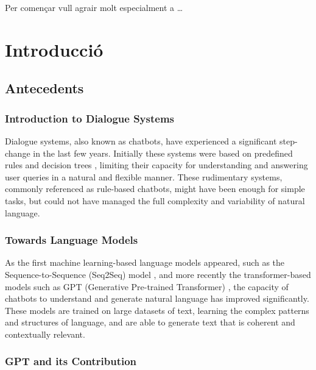 \documentclass[a4paper,12pt,twoside]{ThesisStyle}
\begin{document}
Per començar vull agrair molt especialment a \ldots


\tableofcontents

\listoffigures

\listoftables

\mainmatter

\chapter{Introducció}
\label{cap:intro}

\section{Antecedents}
\label{sec:antecedents}

\subsection{Introduction to Dialogue Systems}
\label{subsec:chat}

Dialogue systems, also known as chatbots, have experienced a significant step-change in the last few years. Initially these systems were based on predefined rules and decision trees \cite{Weizenbaum1966ELIZA, AbuShawar2015ALICE}, limiting their capacity for understanding and answering user queries in a natural and flexible manner. These rudimentary systems, commonly referenced as rule-based chatbots, might have been enough for simple tasks, but could not have managed the full complexity and variability of natural language.

\subsection{Towards Language Models}
\label{subsec:language}

As the first machine learning-based language models appeared, such as the Sequence-to-Sequence (Seq2Seq) model \cite{Sutskever2014SequenceSequenceLearningNeural}, and more recently the transformer-based models such as GPT (Generative Pre-trained Transformer) \cite{Vaswani2023AttentionNeed, Radford2018ImprovingLU}, the capacity of chatbots to understand and generate natural language has improved significantly. These models are trained on large datasets of text, learning the complex patterns and structures of language, and are able to generate text that is coherent and contextually relevant.

\subsection{GPT and its Contribution}
\label{subsec:gpt}
\end{document}
